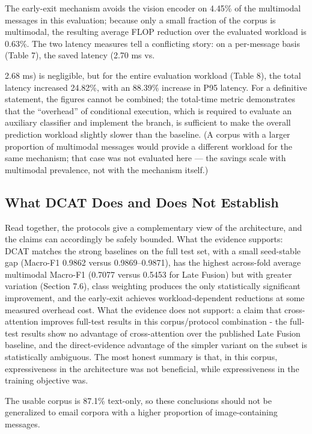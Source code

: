 \documentclass[10pt,twoside]{article}
\begin{document}
The early-exit mechanism avoids the vision encoder on 4.45\% of the multimodal messages in this evaluation; because only a small fraction of the corpus is multimodal, the resulting average FLOP reduction over the evaluated workload is 0.63\%. The two latency measures tell a conflicting story: on a per-message basis (Table 7), the saved latency (2.70 ms vs.

2.68 ms) is negligible, but for the entire evaluation workload (Table 8), the total latency increased 24.82\%, with an 88.39\% increase in P95 latency. For a definitive statement, the figures cannot be combined; the total-time metric demonstrates that the ``overhead'' of conditional execution, which is required to evaluate an auxiliary classifier and implement the branch, is sufficient to make the overall prediction workload slightly slower than the baseline. (A corpus with a larger proportion of multimodal messages would provide a different workload for the same mechanism; that case was not evaluated here --- the savings scale with multimodal prevalence, not with the mechanism itself.)

\subsection{What DCAT Does and Does Not Establish}\label{sec:8.5}

Read together, the protocols give a complementary view of the architecture, and the claims can accordingly be safely bounded. What the evidence supports: DCAT matches the strong baselines on the full test set, with a small seed-stable gap (Macro-F1 0.9862 versus 0.9869--0.9871), has the highest across-fold average multimodal Macro-F1 (0.7077 versus 0.5453 for Late Fusion) but with greater variation (Section 7.6), class weighting produces the only statistically significant improvement, and the early-exit achieves workload-dependent reductions at some measured overhead cost. What the evidence does not support: a claim that cross-attention improves full-test results in this corpus/protocol combination - the full-test results show no advantage of cross-attention over the published Late Fusion baseline, and the direct-evidence advantage of the simpler variant on the subset is statistically ambiguous. The most honest summary is that, in this corpus, expressiveness in the architecture was not beneficial, while expressiveness in the training objective was.

The usable corpus is 87.1\% text-only, so these conclusions should not be generalized to email corpora with a higher proportion of image-containing messages.
\end{document}
